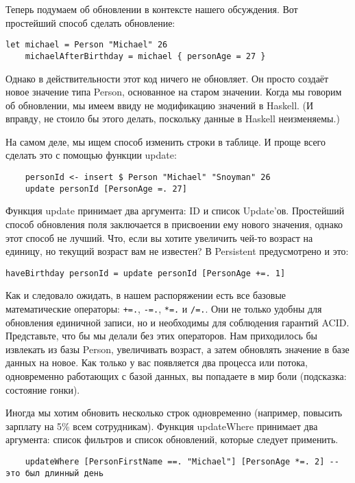 Теперь подумаем об обновлении в контексте нашего обсуждения. Вот простейший
способ сделать обновление:

\begin{lstlisting}
let michael = Person "Michael" 26
    michaelAfterBirthday = michael { personAge = 27 }
\end{lstlisting}

Однако в действительности этот код ничего не обновляет. Он просто создаёт новое
значение типа Person, основанное на старом значении. Когда мы говорим об
обновлении, мы имеем ввиду не модификацию значений в Haskell. (И вправду, не
стоило бы этого делать, поскольку данные в Haskell неизменяемы.)

На самом деле, мы ищем способ изменить строки в таблице. И проще всего сделать
это с помощью функции update:

\begin{lstlisting}
    personId <- insert $ Person "Michael" "Snoyman" 26
    update personId [PersonAge =. 27]
\end{lstlisting}

Функция update принимает два аргумента: ID и список Update'ов. Простейший
способ обновления поля заключается в присвоении ему нового значения, однако
этот способ не лучший. Что, если вы хотите увеличить чей-то возраст на единицу,
но текущий возраст вам не известен? В Persistent предусмотрено и это:

\begin{lstlisting}
haveBirthday personId = update personId [PersonAge +=. 1]
\end{lstlisting}

Как и следовало ожидать, в нашем распоряжении есть все базовые математические
операторы: \lstinline'+=.', \lstinline'-=.', \lstinline'*=.' и \lstinline'/=.'.
Они не только удобны для обновления единичной записи, но и необходимы для
соблюдения гарантий ACID. Представьте, что бы мы делали без этих операторов.
Нам приходилось бы извлекать из базы Person, увеличивать возраст, а затем
обновлять значение в базе данных на новое. Как только у вас появляется два
процесса или потока, одновременно работающих с базой данных, вы попадаете в мир
боли (подсказка: состояние гонки).

Иногда мы хотим обновить несколько строк одновременно (например, повысить
зарплату на 5\% всем сотрудникам). Функция updateWhere принимает два аргумента:
список фильтров и список обновлений, которые следует применить.

\begin{lstlisting}
    updateWhere [PersonFirstName ==. "Michael"] [PersonAge *=. 2] -- это был длинный день
\end{lstlisting}

